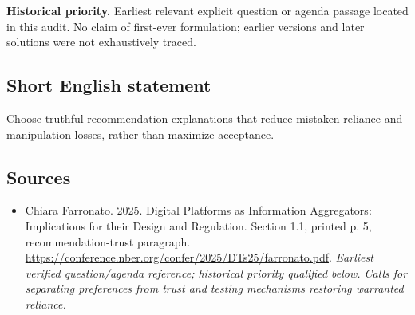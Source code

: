 \documentclass[11pt]{article}
\begin{document}
\par\textbf{Historical priority.} Earliest relevant explicit question or agenda passage located in this audit. No claim of first-ever formulation; earlier versions and later solutions were not exhaustively traced.

\subsection{Short English statement}
Choose truthful recommendation explanations that reduce mistaken reliance and manipulation losses, rather than maximize acceptance.

\subsection{Sources}
\begin{itemize}\raggedright
\item[\textnormal{[S1]}]\hypertarget{source:30007686:1}{} Chiara Farronato. 2025. Digital Platforms as Information Aggregators: Implications for their Design and Regulation. Section 1.1, printed p. 5, recommendation-trust paragraph.
\url{https://conference.nber.org/confer/2025/DTs25/farronato.pdf}.
{\small\textit{Earliest verified question/agenda reference; historical priority qualified below. Calls for separating preferences from trust and testing mechanisms restoring warranted reliance.}}
\end{itemize}
\end{document}
